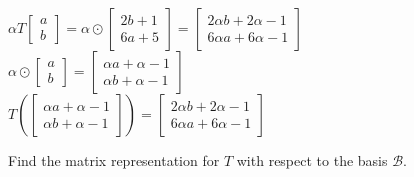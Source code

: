 \begin{solution}
		\\
		$\alpha T\begin{bmatrix}a\\b\end{bmatrix}=\alpha\odot\begin{bmatrix}2b+1\\6a+5\end{bmatrix}=\begin{bmatrix}2\alpha b+ 2\alpha-1\\6\alpha a + 6\alpha -1\end{bmatrix}$
		\\
		$\alpha\odot\begin{bmatrix}a \\ b\end{bmatrix}= \begin{bmatrix}\alpha a + \alpha -1\\ \alpha b +\alpha-1\end{bmatrix}$
		\\
		$T\left(\begin{bmatrix}\alpha a + \alpha -1\\ \alpha b +\alpha-1\end{bmatrix} \right)=\begin{bmatrix}2\alpha b+ 2\alpha-1\\6\alpha a + 6\alpha -1\end{bmatrix}$
		\end{solution}	
		
		\item Find the matrix representation for $T$ with respect to the basis $\mathcal{B}$.
		
